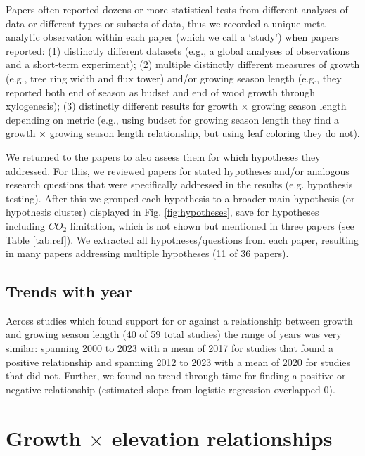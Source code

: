 \documentclass[11pt]{article}
\begin{document}
Papers often reported dozens or more statistical tests from different analyses of data or different types or subsets of data, thus we recorded a unique meta-analytic observation within each paper (which we call a `study') when papers reported: (1) distinctly different datasets (e.g., a global analyses of observations and a short-term experiment); (2) multiple distinctly different measures of growth (e.g., tree ring width and flux tower) and/or growing season length (e.g., they reported both end of season as budset and end of wood growth through xylogenesis); (3) distinctly different results for growth $\times$  growing season length depending on metric (e.g., using budset for growing season length they find a growth $\times$ growing season length relationship, but using leaf coloring they do not). 

We returned to the papers to also assess them for which hypotheses they addressed. For this, we reviewed papers for stated hypotheses and/or analogous research questions that were specifically addressed in the results (e.g. hypothesis testing).  After this we grouped each hypothesis to a broader main hypothesis (or hypothesis cluster) displayed in Fig. \ref{fig:hypotheses}, save for hypotheses including $CO_2$ limitation, which is not shown but mentioned in three papers (see Table \ref{tab:ref}). We extracted all hypotheses/questions from each paper, resulting in many papers addressing multiple hypotheses
(11 of 36 papers). 

\subsection*{Trends with year}
Across studies which found support for or against a relationship between growth and growing season length (40 of 59 total studies) the range of years was very similar: spanning 2000 to 2023 with a mean of 2017 for studies that found a positive relationship and spanning 2012 to 2023 with a mean of 2020 for studies that did not. Further, we found no trend through time for finding a positive or negative relationship  (estimated slope from logistic regression overlapped 0). 

\section*{Growth $\times$ elevation relationships}
\end{document}

